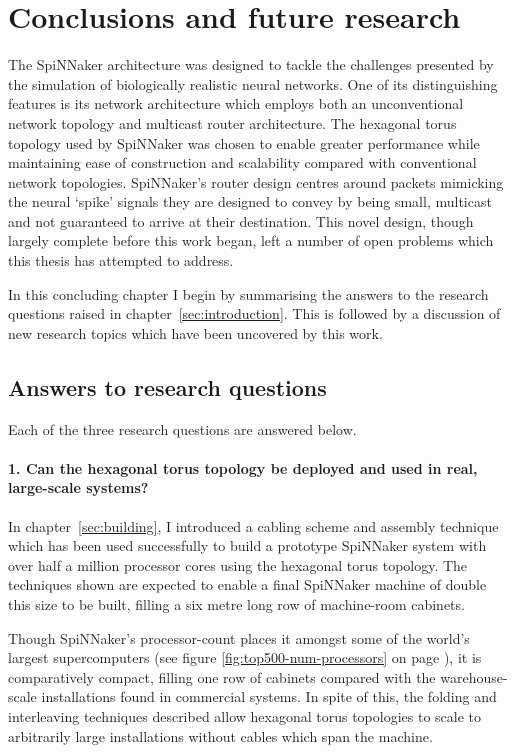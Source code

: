 \chapter{Conclusions and future research}
	
	The SpiNNaker architecture was designed to tackle the challenges presented by
	the simulation of biologically realistic neural networks. One of its
	distinguishing features is its network architecture which employs both an
	unconventional network topology and multicast router architecture. The
	hexagonal torus topology used by SpiNNaker was chosen to enable greater
	performance while maintaining ease of construction and scalability compared
	with conventional network topologies. SpiNNaker's router design centres
	around packets mimicking the neural `spike' signals they are designed to
	convey by being small, multicast and not guaranteed to arrive at their
	destination.  This novel design, though largely complete before this work
	began, left a number of open problems which this thesis has attempted to
	address.
	
	In this concluding chapter I begin by summarising the answers to the research
	questions raised in chapter~\ref{sec:introduction}. This is followed by a
	discussion of new research topics which have been uncovered by this work.
	
	\section{Answers to research questions}
		
		Each of the three research questions are answered below.
		
		\subsubsection{1. Can the hexagonal torus topology be deployed and used in
		real, large-scale systems?}
		
		In chapter~\ref{sec:building}, I introduced a cabling scheme and assembly
		technique which has been used successfully to build a prototype SpiNNaker
		system with over half a million processor cores using the hexagonal torus
		topology. The techniques shown are expected to enable a final SpiNNaker
		machine of double this size to be built, filling a six metre long row of
		machine-room cabinets.
		
		Though SpiNNaker's processor-count places it amongst some of the world's
		largest supercomputers (see figure \ref{fig:top500-num-processors} on page
		\pageref{fig:top500-num-processors}), it is comparatively compact, filling
		one row of cabinets compared with the warehouse-scale installations found
		in commercial systems. In spite of this, the folding and interleaving
		techniques described allow hexagonal torus topologies to scale to
		arbitrarily large installations without cables which span the machine.
		
